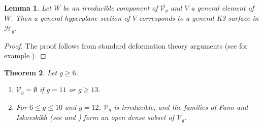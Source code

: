 \documentclass[11pt,twoside]{amsart}
\theoremstyle{plain}
\newtheorem{theorem}{Theorem}[section]
\newtheorem{lemma}[theorem]{Lemma}
\theoremstyle{definition}
\begin{document}
\begin{lemma}\label{lem:hypsection}
Let $W$ be an irreducible component of $\overline{\mathcal V_g}$ and $V$ a general element of $W$. Then a general hyperplane section of $V$ corresponds to a general K3 surface in $\mathcal H_g$.
\end{lemma}

\begin{proof}
The proof follows from standard deformation theory arguments (see for example \cite[Lemma~3.7]{CLM98}).
\end{proof}

\begin{theorem}\label{thm:fano}
Let $g\ge6$.
\begin{enumerate}
\item $\mathcal V_g=\emptyset$ if $g=11$ or $g\ge13$.
\item For $6\le g\le10$ and $g=12$, $\mathcal V_g$ is irreducible, and the families of Fano and Iskovskikh \cite{Isk77,Isk78} (see \cite{Muk88} and \cite[Table~3.1]{CLM98}) form an open dense subset of $\mathcal V_g$.
\end{enumerate}
\end{theorem}
\end{document}
